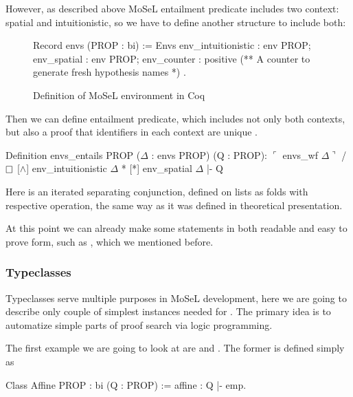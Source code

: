 However, as described above MoSeL entailment predicate includes two context: spatial and intuitionistic, so we have to define another structure to include both:

\begin{figure}[H]
\centering
\begin{coq}
Record envs (PROP : bi) := Envs {
  env_intuitionistic : env PROP;
  env_spatial : env PROP;
  env_counter : positive (** A counter to generate fresh hypothesis names *)
}.
\end{coq}  
  \caption{Definition of MoSeL environment in Coq}
  \label{fig:coq_envs}
\end{figure}


Then we can define entailment predicate, which includes not only both contexts, but also a proof that identifiers in each context are unique .
\begin{coq}
  Definition envs_entails {PROP} ($\Delta$ : envs PROP) (Q : PROP):
  $\ulcorner$ envs_wf $\Delta \urcorner$ /\ $\mathop{\Box}$ [$\wedge$] env_intuitionistic $\Delta$ * [*] env_spatial $\Delta$ |- Q
\end{coq}

Here \coqe{[*]} is an iterated separating conjunction, defined on lists as folds with respective operation, the same way as it was defined in theoretical presentation.

At this point we can already make some statements in both readable and easy to prove form, such as , which we mentioned before.\\

\subsubsection{Typeclasses}
\label{subsubsec:typeclasses}

Typeclasses serve multiple purposes in MoSeL development, here we are going to describe only couple of simplest instances needed for .
The primary idea is to automatize simple parts of proof search via logic programming.

The first example we are going to look at are  and .
The former is defined simply as
\begin{coq}
Class Affine {PROP : bi} (Q : PROP) := affine : Q |- emp.
\end{coq}

